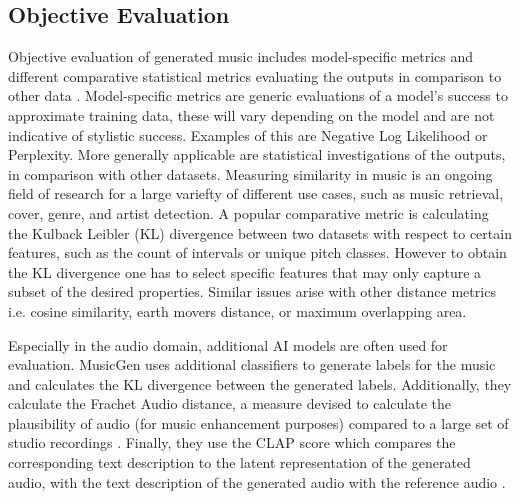 \subsection{Objective Evaluation}

Objective evaluation of generated music includes model-specific metrics and different comparative statistical metrics evaluating the outputs in comparison to other data \cite{Xiong_Wang_ai_eval_methods_2023}. Model-specific metrics are generic evaluations of a model's success to approximate training data, these will vary depending on the model and are not indicative of stylistic success. Examples of this are Negative Log Likelihood \cite{Huang_Vaswani_Uszkoreit_Shazeer_Simon_Hawthorne_Dai_Hoffman_Dinculescu_Eck_2018} or Perplexity\cite{Rütte_figaro_2023}. 
More generally applicable are statistical investigations of the outputs, in comparison with other datasets. Measuring similarity in music is an ongoing field of research \cite{Gurjar_Moon_similarity_2018} for a large variefty of different use cases, such as music retrieval, cover, genre, and artist detection. A popular comparative metric is calculating the Kulback Leibler (KL) divergence between two datasets with respect to certain features, such as the count of intervals or unique pitch classes. However to obtain the KL divergence one has to select specific features that may only capture a subset of the desired properties. Similar issues arise with other distance metrics i.e. cosine similarity, earth movers distance, or maximum overlapping area. 

Especially in the audio domain, additional AI models are often used for evaluation. MusicGen \cite{copet2023simple} uses additional classifiers to generate labels for the music and calculates the KL divergence between the generated labels. Additionally, they calculate the Frachet Audio distance, a measure devised to calculate the plausibility of audio (for music enhancement purposes) compared to a large set of studio recordings \cite{Kilgour_Frachet_2019}. Finally, they use the CLAP score which compares the corresponding text description to the latent representation of the generated audio, with the text description of the generated audio with the reference audio \cite{Elizalde_Deshmukh_Ismail_Wang_2023}. 
